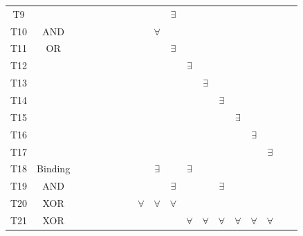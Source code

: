 \begin{table}[h]
{\begin{tabular}{cc|ccc:ccc:ccc:cccccccc}
			T9   &             &     &      &     &      &      &      &      &      & $\exists$     &     &      &      &      &      &      &      &      \\
			T10  & AND            &     &  \cmark    &     &      &      &      &      & $\forall$     &      &     &      &      &      &      &      &      &      \\
			T11  & OR            &     &      &     &      &      & \cmark     &      &      & $\exists$     &     &      &      &      &      &      &      &      \\
			T12  &             &     &      &     &      &      &      &      &      &      & $\exists$     &      &      &      &      &      &      &      \\
			T13  &             &     &      &     &      &      &      &      &      &      &     & $\exists$     &      &      &      &      &      &      \\
			T14  &             &     &      &     &      &      &      &      &      &      &     &      & $\exists$     &      &      &      &      &      \\
			T15  &             &     &      &     &      &      &      &      &      &      &     &      &      & $\exists$      &      &      &      &      \\
			T16  &             &     &      &     &      &      &      &      &      &      &     &      &      &      & $\exists$     &      &      &      \\
			T17  &             &     &      &     &      &      &      &      &      &      &     &      &      &      &      & $\exists$     &      &      \\
			\hdashline
			T18  & Binding            &     &      &     &      &      &      &      & $\exists$      &      & $\exists$     &      &      &      &      &      &      &      \\
			T19  & AND            &     &      & \cmark     &      &      &      &      &      & $\exists$      &     &      & $\exists$      &      &      &      &      &      \\
			T20  & XOR            &     &      &     &      &      &      & $\forall$     & $\forall$     & $\forall$     &     &      &      &      &      &      &      &      \\
			T21  & XOR            &     &      &     &      &      &      &      &      &      & $\forall$    & $\forall$     & $\forall$     &   $\forall$   & $\forall$     & $\forall$     &      &      \\

\end{tabular}}
\end{table}
